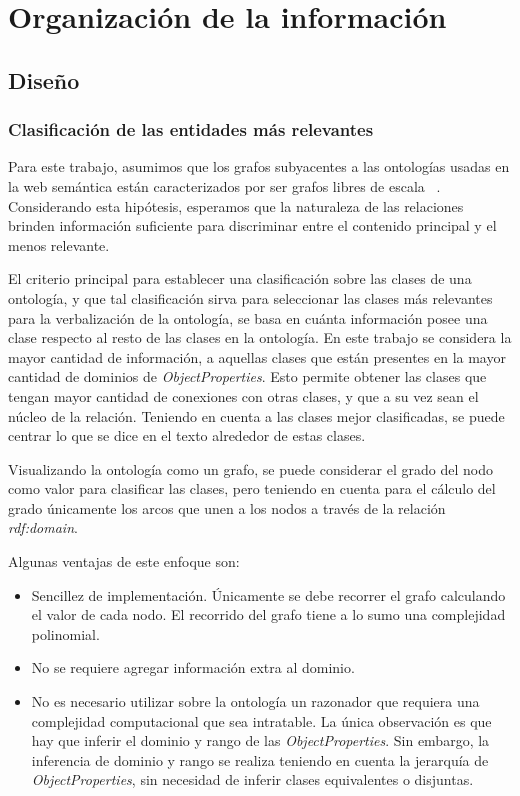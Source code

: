 \chapter{Organización de la información}

\section{Diseño}
\subsection{Clasificación de las entidades más relevantes}
Para este trabajo, asumimos que los grafos subyacentes a las ontologías usadas en la web semántica están caracterizados por ser grafos libres de escala ~\cite{zhang2008scale}. Considerando esta hipótesis, esperamos que la naturaleza de las relaciones brinden información suficiente para discriminar entre el contenido principal y el menos relevante.

El criterio principal para establecer una clasificación sobre las clases de una ontología, y que tal clasificación sirva para seleccionar las clases más relevantes para la verbalización de la ontología, se basa en cuánta información posee una clase respecto al resto de las clases en la ontología. En este trabajo se considera la mayor cantidad de información, a aquellas clases que están presentes en la mayor cantidad de dominios de \emph{ObjectProperties}. Esto permite obtener las clases que tengan mayor cantidad de conexiones con otras clases, y que a su vez sean el núcleo de la relación. Teniendo en cuenta a las clases mejor clasificadas, se puede centrar lo que se dice en el texto alrededor de estas clases.

Visualizando la ontología como un grafo, se puede considerar el grado del nodo como valor para clasificar las clases, pero teniendo en cuenta para el cálculo del grado únicamente los arcos que  
unen a los nodos a través de la relación \emph{rdf:domain}.

Algunas ventajas de este enfoque son:
\begin{itemize}
    \item Sencillez de implementación. Únicamente se debe recorrer el grafo calculando el valor de cada nodo. El recorrido del grafo tiene a lo sumo una complejidad polinomial.
    \item No se requiere agregar información extra al dominio.
    \item No es necesario utilizar sobre la ontología un razonador que requiera una complejidad computacional que sea intratable. La única observación es que hay que inferir el dominio y rango de las \emph{ObjectProperties}. Sin embargo, la inferencia de dominio y rango se realiza teniendo en cuenta la jerarquía de \emph{ObjectProperties}, sin necesidad de inferir clases equivalentes o disjuntas.
\end{itemize}

